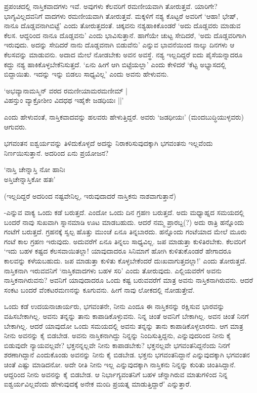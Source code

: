 ಪ್ರಪಂಚದಲ್ಲಿ ನಾಸ್ತಿಕವಾದಗಳು ಇವೆ. ಅವುಗಳು ಕೆಲವರಿಗೆ ರಮಣೀಯವಾಗಿ ತೋರುತ್ತವೆ. ಯಾರಿಗೇ? ಭಾಗ್ಯವಿಲ್ಲದವನಿಗೆ ವಾದಗಳು ರಮಣೀಯವಾಗಿ ತೋರುತ್ತವೆ. ಮಕ್ಕಳಿಗೆ ನಶ್ಯ ಕೊಟ್ಟರೆ ಅವರಿಗೆ `ಆಹಾ! ಭೇಷ್, ನಾನೂ ದೊಡ್ಡವನಾಗಿಬಿಟ್ಟೆ' ಎಂದು ತೋರುತ್ತದಂತೆ. ಚಿಕ್ಕವನು ನಶ್ಯಹಾಕಿಕೊಂಡರೆ `ಅದು ದೊಡ್ಡವರು ಮಾಡುವ ಕೆಲಸ. ಆದ್ದರಿಂದ ನಾನೂ ದೊಡ್ಡವನು' ಎಂದು ಭಾವಿಸುತ್ತಾನೆ. ಹಾಗೆಯೇ ಚುಟ್ಟ ಸೇದಿದರೆ, `ಅದು ದೊಡ್ಡವರಿಗಾಗಿ ಇರುವುದು. ಅದನ್ನು ಸೇದಿದರೆ ನಾನು ದೊಡ್ಡವನಾಗಿ ಬಿಡುವೆನು' ಎನ್ನುವ ಭಾವನೆಯಿಂದ ನಾಲ್ಕು ದಿನಗಳು ಆ ಕೆಲಸವನ್ನು ಮಾಡುವನು. ಅದಾದ ಮೇಲೆ ನೋಡಬೇಕು ಅವನ ಅವಸ್ಥೆ. ನಶ್ಯ ಇಲ್ಲದಿದ್ದರೆ ಐದು ಪೈಸೆಯನ್ನಾದರೂ ಕದ್ದು ನಶ್ಯ ಹಾಕಿಕೊಳ್ಳಬೇಕೆನಿಸುತ್ತದೆ. `ಏನು ಹೀಗೆ ಆಗಿ ಬಿಟ್ಟೆಯಲ್ಲಾ' ಎಂದು ಕೇಳಿದರೆ `ಕೆಟ್ಟ ಅಭ್ಯಾಸದಲ್ಲಿ ಬಿದ್ದಾಯಿತು. ಇದನ್ನು ಇನ್ನು ಬಿಡಲು ಸಾಧ್ಯವಿಲ್ಲ' ಎಂದು ಅವನು ಹೇಳುವನು.

\begin{shloka}
`ಅಭವ್ಯಾನಾಮಸ್ಮಿನ್ ವರದ ರಮಣೀಯಾಮರಮಣೀಮ್ |\\
ವಿಹನ್ತುಂ ವ್ಯಾಕ್ರೋಶೀಂ ವಿದಧಥ ಇಹೈಕೇ ಜಡಧಿಯಃ ||'
\end{shloka}

ಎಂದು ಹೇಳುವಂತೆ, ನಾಸ್ತಿಕವಾದವನ್ನು ಹಲವರು ಹೇಳುತ್ತಿದ್ದರೆ. ಅವರು `ಜಡಧೀಯಃ' (ಮಂದಬುದ್ಧಿಯುಳ್ಳವರು) ಆಗುವರು.

ಭಗವಂತನ ಐಶ್ವರ್ಯವನ್ನು ತಿಳಿದುಕೊಳ್ಳದೆ ಅದನ್ನು ನಿರಾಕರಿಸುವುದಕ್ಕಾಗಿ ಭಗವಂತನು ಇಲ್ಲವೆಂದು ನಿರ್ಣಯಿಸುತ್ತಾನೆ. ಅದರಿಂದ ಏನು ಪ್ರಯೋಜನ?

\begin{shloka}
`ನಾಸ್ತಿ ಚೇನ್ನಾಸ್ತಿ ನೋ ಹಾನಿಃ\\
ಅಸ್ತಿಚೇನ್ನಾಸ್ತಿಕೋ ಹತಃ'
\end{shloka}

(ಇಲ್ಲದಿದ್ದರೆ ಅದರಿಂದ ನಷ್ಟವೇನಿಲ್ಲ, ಇರುವುದಾದರೆ ನಾಸ್ತಿಕನು ನಾಶವಾಗುತ್ತಾನೆ)

-ಎನ್ನುವ ವಾಕ್ಯ ಒಂದು ಕಡೆ ಬರುತ್ತದೆ. ಎಂದೋ ಒಂದು ದಿನ ಗ್ರಹಣ ಬರುತ್ತದೆ. ಅದು ಮಧ್ಯಾಹ್ನದ ಸಮಯದಲ್ಲಿ ಬಂದರೆ ನಾವು ಸುಖವಾಗಿ ಸ್ನಾನಮಾಡಿ ಊಟ ಮಾಡಬಹುದು. ಆದರೆ ನಮ್ಮ ಪ್ರಾರಬ್ದ(?) ಅದು ರಾತ್ರಿ ಹನ್ನೊಂದು ಗಂಟೆಗೆ ಬರುತ್ತದೆ. ಗ್ರಹನಕ್ಕೆ ಸ್ವಲ್ಪ ಹೊತ್ತು ಮುಂಚೆ ಏನೂ ತಿನ್ನಬಾರದು. ಹನ್ನೊಂದು ಗಂಟೆಯಾದ ಮೇಲೆ ಮೂರು ಗಂಟೆ ಕಾಲ ಗ್ರಹಣ ಇರುವುದು. ಅದುವರೆಗೆ ಏನೂ ತಿನ್ನಲು ಸಾಧ್ಯವಿಲ್ಲ. ಜಪ ಮಾಡುತ್ತಾ ಕುಳಿತಿರಬೇಕು. ಕೆಲವರಿಗೆ `ಇದು ಬಹಳ ಕಷ್ಟದ ಕೆಲಸವಾಯಿತಲ್ಲಾ! ಯಾವುದಾದರೂ ಸಿನಿಮಾಗೆ ಹೋಗಿ ಕುಳಿತುಕೊಂಡರೆ ಹೇಗಾದರೂ ಕಾಲವನ್ನು ಕಳೆಯಬಹುದು. ಜಪ ಮಾಡುತ್ತಾ ಕುಳಿತು ಕೊಳ್ಳಬೇಕೆಂದರೆ ದುಃಖವಾಗುತ್ತದಲ್ಲಾ!' ಎಂದು ತೋರುತ್ತದೆ. ನಾಸ್ತಿಕನಾಗಿ ಇರುವವನಿಗೆ `ನಾಸ್ತಿಕವಾದಗಳು ಬಹಳ ಸರಿ' ಎಂದು ತೋರುವುದು. ಎಲ್ಲಿಯವರೆಗೆ ಅವನು ನಾಸ್ತಿಕನಾಗಿರುವನು? ಅವನಿಗೆ ಯಾವುದಾದರೂ ಒಂದು ಕಷ್ಟ ಬರುವವರೆಗೆ ಮಾತ್ರ ಅವನು ನಾಸ್ತಿಕನಾಗಿರುವನು. ಆದರೆ ಸಂಕಟ ಬಂದರೆ ವೆಂಕಟರಮಣನನ್ನು ಕೂಗುವನು. ಹೀಗೆ ನಾವು ಲೋಕದಲ್ಲಿ ನೋಡುತ್ತೇವೆ.

ಒಂದು ಕಡೆ ಉದಯನಾಚಾರ್ಯರು, ಭಗವಂತನೇ, ನೀನು ಎಂದೂ ಈ ನಾಸ್ತಿಕನನ್ನು ರಕ್ಷಿಸುವ ಭಾರವನ್ನು ವಹಿಸಬೇಕಾಗಿಲ್ಲ. ಅವನು ತನ್ನನ್ನು ತಾನು ಕಾಪಾಡಿಕೊಳ್ಳುವನು. ನಿನ್ನ ಚಿಂತೆ ಅವನಿಗೆ ಬೇಕಾಗಿಲ್ಲ. ಅವನ ಚಿಂತೆ ನಿನಗೆ ಬೇಕಾಗಿಲ್ಲ. ಆದರೆ ಯಾವುದೋ ಒಂದು ಸಮಯದಲ್ಲಿ ಅವನು ತನ್ನನ್ನು ತಾನು ಕಾಪಾಡಿಕೊಳ್ಳಲಾರನು. ಆಗ ಮಾತ್ರ ನೀನು ಅವನನ್ನು ಕೈ ಬಿಡಬೇಡ. ಅವನು ನಾಸ್ತಿಕನಾಗಿದ್ದು ನಿನ್ನನ್ನು ನಿಂದಿಸುತ್ತಿದ್ದನು, ಎನ್ನುವುದರಿಂದ ನೀನು ಕೈ ಬಿಡುವುದೇ ನ್ಯಾಯವಲ್ಲವೇ? ಭಕ್ತನನ್ನಲ್ಲವೇ ನೀನು ಕಾಪಾಡಬೇಕು? ಭಕ್ತನಲ್ಲವೇ ಭಗವಂತನಿದ್ದನೆಂದು ನಿನಗೆ ಶರಣಾಗಿದ್ದಾನೆ ಎಂದುಕೊಂಡು ಅವನನ್ನು ನೀನು ಕೈ ಬಿಡಬೇಡ. ಭಕ್ತನು ಭಗವಂತನಿದ್ದಾನೆ ಎನ್ನುವುದಕ್ಕಾಗಿ ಭಗವಂತನ ಚಿಂತೆ ಎಷ್ಟು ಮಾಡಿದನೋ. ಅದೇ ರೀತಿ ನೀನು ಇಲ್ಲ ಎನ್ನುವುದಕ್ಕಾಗಿ ನಾಸ್ತಿಕನು ನಿನ್ನನ್ನು ಕುರಿತು ಚಿಂತಿಸಿದ್ದಾನೆ. ಆದ್ದರಿಂದ ನೀನು ಅವನನ್ನು ಕೈ ಬಿಡಬೇಡ. ಆ ನಿರ್ಭಾಗ್ಯವಂತನಿಗೆ ಬಹಳ ಚೆನ್ನಾಗಿರುವ ಮಾತುಗಳಿಂದ ನಿನ್ನ ಐಶ್ವರ್ಯವಿಲ್ಲವೆಂದು ಹೇಳುವುದಕ್ಕೆ ಅನೇಕ ಮಂದಿ ಪ್ರಯತ್ನ ಮಾಡುತ್ತಿದ್ದಾರೆ' ಎನ್ನುತ್ತಾರೆ.

